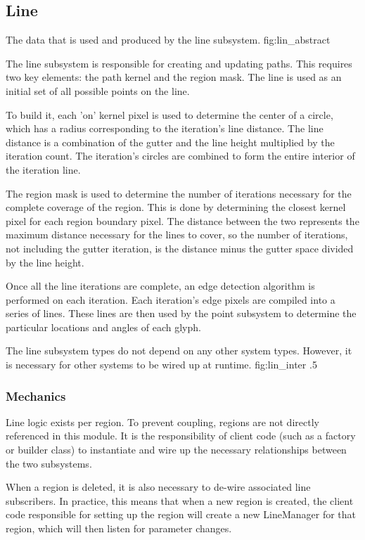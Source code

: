 \subsection{Line}

{The data that is used and produced by the line subsystem.}
{fig:lin_abstract}

The line subsystem is responsible for creating and updating paths.
This requires two key elements: the path kernel and the region mask.
The line is used as an initial set of all possible points on the line.

To build it, each 'on' kernel pixel is used to determine the center of a circle, which has a radius corresponding to the iteration's line distance.
The line distance is a combination of the gutter and the line height multiplied by the iteration count.
The iteration's circles are combined to form the entire interior of the iteration line.

The region mask is used to determine the number of iterations necessary for the complete coverage of the region.
This is done by determining the closest kernel pixel for each region boundary pixel.
The distance between the two represents the maximum distance necessary for the lines to cover, so the number of iterations, not including the gutter iteration, is the distance minus the gutter space divided by the line height.

Once all the line iterations are complete, an edge detection algorithm is performed on each iteration.
Each iteration's edge pixels are compiled into a series of lines.
These lines are then used by the point subsystem to determine the particular locations and angles of each glyph.

{The line subsystem types do not depend on any other system types.  However, it is necessary for other systems to be wired up at runtime.}
{fig:lin_inter}
{.5}


\subsubsection{Mechanics}
Line logic exists per region.
To prevent coupling, regions are not directly referenced in this module.
It is the responsibility of client code (such as a factory or builder class) to instantiate and wire up the necessary relationships between the two subsystems.

When a region is deleted, it is also necessary to de-wire associated line subscribers.
In practice, this means that when a new region is created, the client code responsible for setting up the region will create a new LineManager for that region, which will then listen for parameter changes.

